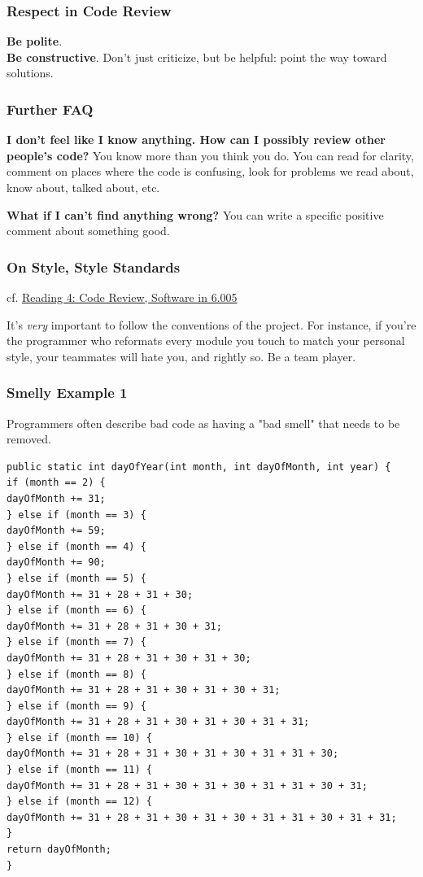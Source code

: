 \documentclass[10pt]{amsart}
\begin{document}
\begin{multicols*}{2}
\subsubsection{Respect in Code Review}
\textbf{Be polite}. \\
\textbf{Be constructive}. Don't just criticize, but be helpful: point the way toward solutions.

\subsubsection{Further FAQ}

\textbf{I don't feel like I know anything. How can I possibly review other people's code?} You know more than you think you do. You can read for clarity, comment on places where the code is confusing, look for problems we read about, know about, talked about, etc.

\textbf{What if I can't find anything wrong?} You can write a specific positive comment about something good.


\subsubsection{On Style, Style Standards}

cf. \href{https://ocw.mit.edu/ans7870/6/6.005/s16/classes/04-code-review/index.html}{Reading 4: Code Review, Software in 6.005}

It's \emph{very} important to follow the conventions of the project. For instance, if you're the programmer who reformats every module you touch to match your personal style, your teammates will hate you, and rightly so. Be a team player.

\subsubsection{Smelly Example 1}

Programmers often describe bad code as having a "bad smell" that needs to be removed.

\begin{verbatim}
public static int dayOfYear(int month, int dayOfMonth, int year) {
if (month == 2) {
dayOfMonth += 31;
} else if (month == 3) {
dayOfMonth += 59;
} else if (month == 4) {
dayOfMonth += 90;
} else if (month == 5) {
dayOfMonth += 31 + 28 + 31 + 30;
} else if (month == 6) {
dayOfMonth += 31 + 28 + 31 + 30 + 31;
} else if (month == 7) {
dayOfMonth += 31 + 28 + 31 + 30 + 31 + 30;
} else if (month == 8) {
dayOfMonth += 31 + 28 + 31 + 30 + 31 + 30 + 31;
} else if (month == 9) {
dayOfMonth += 31 + 28 + 31 + 30 + 31 + 30 + 31 + 31;
} else if (month == 10) {
dayOfMonth += 31 + 28 + 31 + 30 + 31 + 30 + 31 + 31 + 30;
} else if (month == 11) {
dayOfMonth += 31 + 28 + 31 + 30 + 31 + 30 + 31 + 31 + 30 + 31;
} else if (month == 12) {
dayOfMonth += 31 + 28 + 31 + 30 + 31 + 30 + 31 + 31 + 30 + 31 + 31;
}
return dayOfMonth;
}
\end{verbatim}


\end{multicols*}
\end{document}
